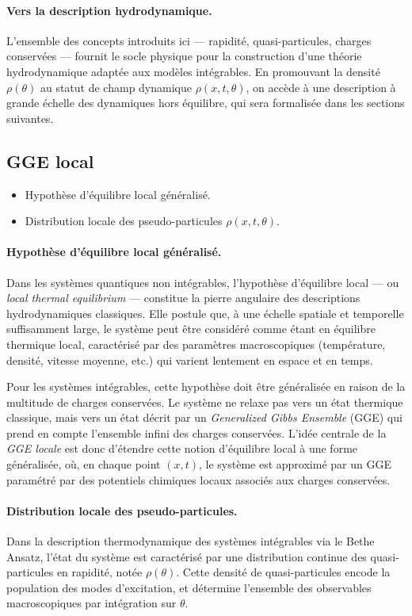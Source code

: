 \paragraph{Vers la description hydrodynamique.}
L’ensemble des concepts introduits ici — rapidité, quasi-particules, charges conservées — fournit le socle physique pour la construction d’une théorie hydrodynamique adaptée aux modèles intégrables. En promouvant la densité $\rho(\theta)$ au statut de champ dynamique $\rho(x,t,\theta)$, on accède à une description à grande échelle des dynamiques hors équilibre, qui sera formalisée dans les sections suivantes.


\subsection{GGE local}
{\color{blue}
\begin{itemize}
    \item Hypothèse d’équilibre local généralisé.
    \item Distribution locale des pseudo-particules $\rho(x,t,\theta)$.
\end{itemize}
}

\paragraph{Hypothèse d’équilibre local généralisé.}
Dans les systèmes quantiques non intégrables, l’hypothèse d’équilibre local — ou \emph{local thermal equilibrium} — constitue la pierre angulaire des descriptions hydrodynamiques classiques. Elle postule que, à une échelle spatiale et temporelle suffisamment large, le système peut être considéré comme étant en équilibre thermique local, caractérisé par des paramètres macroscopiques (température, densité, vitesse moyenne, etc.) qui varient lentement en espace et en temps. 

Pour les systèmes intégrables, cette hypothèse doit être généralisée en raison de la multitude de charges conservées. Le système ne relaxe pas vers un état thermique classique, mais vers un état décrit par un \emph{Generalized Gibbs Ensemble} (GGE) qui prend en compte l’ensemble infini des charges conservées. L’idée centrale de la \emph{GGE locale} est donc d’étendre cette notion d’équilibre local à une forme généralisée, où, en chaque point $(x,t)$, le système est approximé par un GGE paramétré par des potentiels chimiques locaux associés aux charges conservées.

\paragraph{Distribution locale des pseudo-particules.}
Dans la description thermodynamique des systèmes intégrables via le Bethe Ansatz, l’état du système est caractérisé par une distribution continue des quasi-particules en rapidité, notée $\rho(\theta)$. Cette densité de quasi-particules encode la population des modes d’excitation, et détermine l’ensemble des observables macroscopiques par intégration sur $\theta$.

